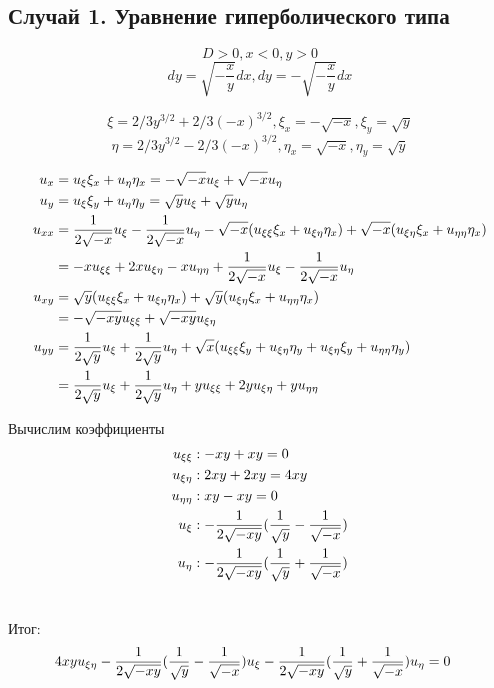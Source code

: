 \documentclass[a4paper,12pt]{article}
\begin{document}
\subsection{Случай 1. Уравнение гиперболического типа}
$$D > 0, x < 0, y > 0$$
$$dy = \sqrt{-\frac{x}{y}}dx,
dy = -\sqrt{-\frac{x}{y}}dx$$

$$\xi = 2/3y^{3/2} + 2/3(-x)^{3/2}, \xi_x = -\sqrt{-x}, \xi_y = \sqrt{y}$$
$$\eta = 2/3y^{3/2} - 2/3(-x)^{3/2}, \eta_x = \sqrt{-x}, \eta_y = \sqrt{y}$$

\begin{align}
u_x &= u_\xi\xi_x + u_\eta\eta_x = -\sqrt{-x}u_\xi + \sqrt{-x}u_\eta \notag \\ \notag
u_y &= u_\xi\xi_y + u_\eta\eta_y = \sqrt{y}u_\xi + \sqrt{y}u_\eta \\ \notag
u_{xx} &= \frac{1}{2\sqrt{-x}}u_\xi - \frac{1}{2\sqrt{-x}}u_\eta 
- \sqrt{-x}(u_{\xi\xi}\xi_x + u_{\xi\eta}\eta_x)
+ \sqrt{-x}(u_{\xi\eta}\xi_x + u_{\eta\eta}\eta_x) \\ \notag
&= -xu_{\xi\xi} + 2xu_{\xi\eta} - xu_{\eta\eta} + \frac{1}{2\sqrt{-x}}u_\xi - \frac{1}{2\sqrt{-x}}u_\eta \\ \notag
u_{xy} &= \sqrt{y}(u_{\xi\xi}\xi_x + u_{\xi\eta}\eta_x) + \sqrt{y}(u_{\xi\eta}\xi_x + u_{\eta\eta}\eta_x)  \\ \notag
&= -\sqrt{-xy}u_{\xi\xi} + \sqrt{-xy}u_{\xi\eta} \\ \notag
u_{yy} &= \frac{1}{2\sqrt{y}}u_\xi + \frac{1}{2\sqrt{y}}u_\eta + \sqrt{x}(u_{\xi\xi}\xi_y + u_{\xi\eta}\eta_y + u_{\xi\eta}\xi_y + u_{\eta\eta}\eta_y) \\ \notag
&= \frac{1}{2\sqrt{y}}u_\xi + \frac{1}{2\sqrt{y}}u_\eta + yu_{\xi\xi} + 2yu_{\xi\eta} + yu_{\eta\eta} \notag
\end{align}

Вычислим коэффициенты
\begin{align}
u_{\xi\xi} &: -xy + xy = 0 \notag \\ \notag
u_{\xi\eta} &: 2xy + 2xy = 4xy \\ \notag
u_{\eta\eta} &: xy - xy = 0 \\ \notag
u_\xi &: -\frac{1}{2\sqrt{-xy}}(\frac{1}{\sqrt{y}} - \frac{1}{\sqrt{-x}}) \\ \notag
u_\eta &: -\frac{1}{2\sqrt{-xy}}(\frac{1}{\sqrt{y}} + \frac{1}{\sqrt{-x}}) \\ \notag
\end{align}

Итог:
\begin{align}
4xyu_{\xi\eta} \notag
- \frac{1}{2\sqrt{-xy}}(\frac{1}{\sqrt{y}} - \frac{1}{\sqrt{-x}})u_\xi \notag 
&- \frac{1}{2\sqrt{-xy}}(\frac{1}{\sqrt{y}} + \frac{1}{\sqrt{-x}})u_\eta = 0 \notag
\end{align}
\end{document}
